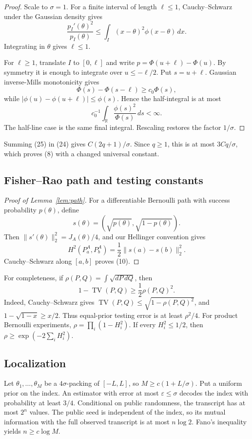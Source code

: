 \documentclass{article}
\theoremstyle{definition}
\theoremstyle{remark}
\newcommand{\R}{\mathbb R}
\newcommand{\1}{\mathbf 1}
\newcommand{\TV}{\operatorname{TV}}
\begin{document}
\begin{proof}
Scale to \(\sigma=1\). For a finite interval of length \(\ell\leq1\), Cauchy--Schwarz under the Gaussian density gives \[ \frac{p_I'(\theta)^2}{p_I(\theta)} \leq\int_I(x-\theta)^2\phi(x-\theta)\,dx. \] Integrating in \(\theta\) gives \(\ell\leq1\).

For \(\ell\geq1\), translate \(I\) to \([0,\ell]\) and write \(p=\Phi(u+\ell)-\Phi(u)\). By symmetry it is enough to integrate over \(u\leq-\ell/2\). Put \(s=u+\ell\). Gaussian inverse-Mills monotonicity gives \[ \Phi(s)-\Phi(s-\ell)\geq c_0\Phi(s), \] while \(|\phi(u)-\phi(u+\ell)|\leq\phi(s)\). Hence the half-integral is at most \[ c_0^{-1}\int_\R\frac{\phi(s)^2}{\Phi(s)}\,ds<\infty. \] The half-line case is the same final integral. Rescaling restores the factor \(1/\sigma\).
\end{proof}

Summing (25) in (24) gives \(C(2q+1)/\sigma\). Since \(q\geq1\), this is at most \(3Cq/\sigma\), which proves (8) with a changed universal constant.

\subsection{Fisher--Rao path and testing constants}

\begin{proof}[Proof of Lemma~\ref{lem:path}]
For a differentiable Bernoulli path with success probability \(p(\theta)\), define \[ s(\theta)=(\sqrt{p(\theta)},\sqrt{1-p(\theta)}). \] Then \(\|s'(\theta)\|_2^2=J_A(\theta)/4\), and our Hellinger convention gives \[ H^2(P_a^A,P_b^A)=\frac12\|s(a)-s(b)\|_2^2. \] Cauchy--Schwarz along \([a,b]\) proves (10).
\end{proof}

For completeness, if \(\rho(P,Q)=\int\sqrt{dP\,dQ}\), then \[ 1-\TV(P,Q)\geq\frac12\rho(P,Q)^2. \tag{26} \] Indeed, Cauchy--Schwarz gives \(\TV(P,Q)\leq\sqrt{1-\rho(P,Q)^2}\), and \(1-\sqrt{1-x}\geq x/2\). Thus equal-prior testing error is at least \(\rho^2/4\). For product Bernoulli experiments, \(\rho=\prod_i(1-H_i^2)\). If every \(H_i^2\leq1/2\), then \(\rho\geq\exp(-2\sum_iH_i^2)\).

\subsection{Localization}

Let \(\theta_1,\ldots,\theta_M\) be a \(4\sigma\)-packing of \([-L,L]\), so \(M\geq c(1+L/\sigma)\). Put a uniform prior on the index. An estimator with error at most \(\varepsilon\leq\sigma\) decodes the index with probability at least \(3/4\). Conditional on public randomness, the transcript has at most \(2^n\) values. The public seed is independent of the index, so its mutual information with the full observed transcript is at most \(n\log2\). Fano's inequality yields \(n\geq c\log M\).
\end{document}
